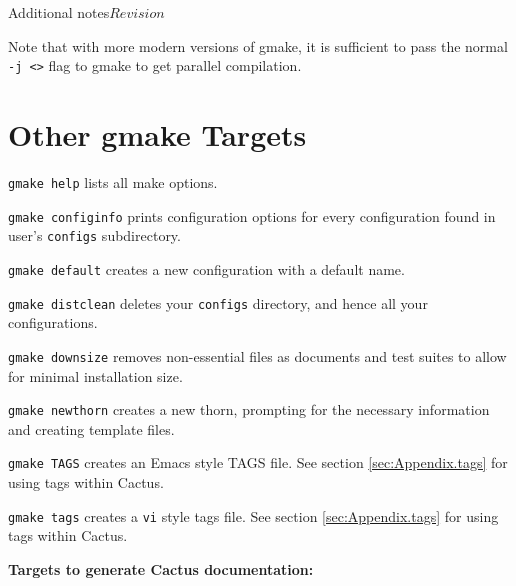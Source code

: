\begin{cactuspart}{Additional notes}{}{$Revision$}
\begin{Lentry}
\end{Lentry}

Note that with more modern versions of gmake, it is sufficient to pass the
normal \texttt{-j <>} flag to gmake to get parallel compilation.





\section{Other gmake Targets}

\begin{Lentry}

\item [\texttt{gmake help}] lists all make options.

\item [\texttt{gmake configinfo}] prints configuration options for every
configuration found in user's \texttt{configs} subdirectory.

\item [\texttt{gmake default}] creates a new configuration with a default name.

\item [\texttt{gmake distclean}] deletes your \texttt{configs} directory, and hence all your configurations.

\item [\texttt{gmake downsize}] removes non-essential files as documents
  and test suites to allow for minimal installation size.

\item [\texttt{gmake newthorn}] creates a new thorn, prompting for the necessary
  information and creating template files.

\item [\texttt{gmake TAGS}] creates an Emacs style TAGS file. See section
  \ref{sec:Appendix.tags} for using tags within Cactus.

\item [\texttt{gmake tags}] creates a \texttt{vi} style tags file. See section
  \ref{sec:Appendix.tags} for using tags within Cactus.

\end{Lentry}

{\bf Targets to generate Cactus documentation:}
\label{sec:OtherGmakeTargetsDoc}


\end{cactuspart}
